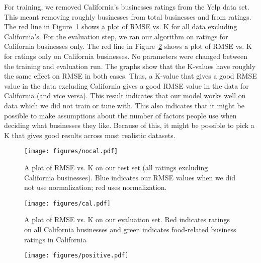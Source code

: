 For training, we removed California's businesses ratings from the Yelp data
set. This meant removing roughly \numBusCA businesses from \numBusTotal total
businesses and \numRatingCA from \numRatingTotal ratings.
The red line in Figure~\ref{fig:nocal} shows a plot of RMSE vs. K for all data excluding
California's. For the evaluation step, we ran our algorithm on ratings for
California businesses only. The red line in Figure~\ref{fig:cal} shows a plot of RMSE vs. K for
ratings only on California businesses. No parameters were changed between the
training and evaluation run. The graphs show that the K-values have roughly the
same effect on RMSE in both cases. Thus, a K-value that gives a good RMSE value
in the data excluding California gives a good RMSE value in the data for
California (and vice versa). This result indicates that our model works well on
data which we did not train or tune with. This also indicates that it might be
possible to make assumptions about the number of factors people use when
deciding what businesses they like. Because of this, it might be possible to
pick a K that gives good results across most realistic datasets.

\begin{figure}[ht!]
	\centering
	\texttt{[image: figures/nocal.pdf]}
	\caption[]{A plot of RMSE vs. K on our test set (all ratings excluding California businesses). Blue indicates our RMSE values when we did not use normalization; red uses normalization.}
	\label{fig:nocal}
\end{figure}


\begin{figure}[ht!]
	\centering
	\texttt{[image: figures/cal.pdf]}
	\caption[]{A plot of RMSE vs. K on our evaluation set. Red indicates ratings on all California businesses and green indicates food-related business ratings in California}
	\label{fig:cal}
\end{figure}

\begin{figure}[ht!]
	\centering
	\texttt{[image: figures/positive.pdf]}
	\caption[]{}
	\label{fig:positive}
\end{figure}


